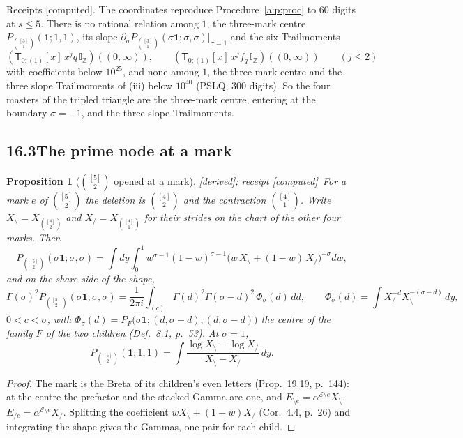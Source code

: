 \documentclass[11pt]{article}
\newcommand{\cE}{\mathcal E}
\newcommand{\one}{\mathbf 1}
\newcommand{\sT}{\mathsf T}
\newcommand{\IZ}{\mathbb I_{\mathbb Z}}
\newcommand{\Tx}[3]{(\sT_{#1;(1)}[x]\,#2)((#3,\infty))}
\theoremstyle{plain}
\newtheorem{proposition}{Proposition}[section]
\theoremstyle{definition}
\theoremstyle{remark}
\newcommand{\derived}{\textup{[derived]}}
\newcommand{\computed}{\textup{[computed]}}
\begin{document}
\noindent Receipts \computed. The coordinates reproduce Procedure~\ref{a:p:proc} to $60$ digits at $s\le5$. There is no rational relation among $1$, the three-mark centre $P_{\binom{[3]}1}(\one;1,1)$, its slope $\partial_\sigma P_{\binom{[3]}1}(\sigma\one;\sigma,\sigma)|_{\sigma=1}$ and the six Trailmoments
\[
\Tx{0}{x^jq\,\IZ}{0},\qquad \Tx{0}{x^jf_q\,\IZ}{0}\qquad(j\le2)
\]
with coefficients below $10^{25}$, and none among $1$, the three-mark centre and the three slope Trailmoments of (iii) below $10^{40}$ (PSLQ, $300$ digits). So the four masters of the tripled triangle are the three-mark centre, entering at the boundary $\sigma=-1$, and the three slope Trailmoments.

\subsection*{16.3\quad The prime node at a mark}

\begin{proposition}[$\binom{[5]}2$ opened at a mark]\label{a:p:u25split}\derived; receipt \computed\
For a mark $e$ of $\binom{[5]}2$ the deletion is $\binom{[4]}2$ and the contraction $\binom{[4]}1$. Write $X_{\setminus}=X_{\binom{[4]}2}$ and $X_{/}=X_{\binom{[4]}1}$ for their strides on the chart of the other four marks. Then
\[
P_{\binom{[5]}2}(\sigma\one;\sigma,\sigma)=\int dy\int_0^1w^{\sigma-1}(1-w)^{\sigma-1}\big(w\,X_{\setminus}+(1-w)\,X_{/}\big)^{-\sigma}dw,
\]
and on the share side of the shape,
\[
\Gamma(\sigma)^2P_{\binom{[5]}2}(\sigma\one;\sigma,\sigma)=\frac1{2\pi i}\int_{(c)}\Gamma(d)^2\Gamma(\sigma-d)^2\,\Phi_\sigma(d)\,dd,\qquad \Phi_\sigma(d)=\int X_{/}^{-d}X_{\setminus}^{-(\sigma-d)}\,dy,
\]
$0<c<\sigma$, with $\Phi_\sigma(d)=P_F\big(\sigma\one;(d,\sigma-d),(d,\sigma-d)\big)$ the centre of the family $F$ of the two children (Def.~8.1, p.~53). At $\sigma=1$,
\[
P_{\binom{[5]}2}(\one;1,1)=\int\frac{\log X_{\setminus}-\log X_{/}}{X_{\setminus}-X_{/}}\,dy .
\]
\end{proposition}

\begin{proof}
The mark is the Breta of its children's even letters (Prop.~19.19, p.~144): at the centre the prefactor and the stacked Gamma are one, and $E_{\setminus e}=\alpha^{\cE\setminus e}X_{\setminus}$, $E_{/e}=\alpha^{\cE\setminus e}X_{/}$. Splitting the coefficient $wX_{\setminus}+(1-w)X_{/}$ (Cor.~4.4, p.~26) and integrating the shape gives the Gammas, one pair for each child.
\end{proof}
\end{document}
